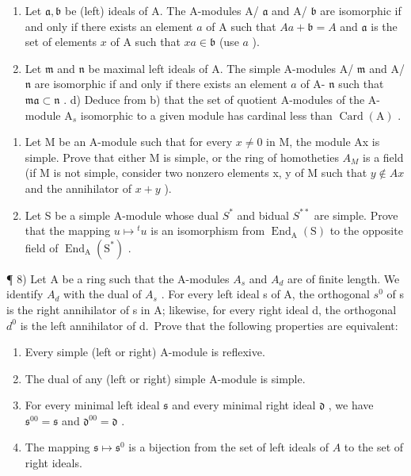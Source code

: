 \begin{enumerate}
\def\labelenumi{\alph{enumi})}
\setcounter{enumi}{1}
\item
  Let \(\mathfrak{a},\mathfrak{b}\) be (left) ideals of A. The A-modules A/ \(\mathfrak{a}\) and A/ \(\mathfrak{b}\) are isomorphic if and only if there exists an element \(a\) of A such that \(Aa + \mathfrak{b} = A\) and \(\mathfrak{a}\) is the set of elements \(x\) of A such that \(xa\in \mathfrak{b}\) (use \(a\) ).
\item
  Let \(\mathfrak{m}\) and \(\mathfrak{n}\) be maximal left ideals of A. The simple A-modules A/ \(\mathfrak{m}\) and A/ \(\mathfrak{n}\) are isomorphic if and only if there exists an element \(a\) of A- \(\mathfrak{n}\) such that \(\mathfrak{ma} \subset \mathfrak{n}\) . d) Deduce from b) that the set of quotient A-modules of the A-module \(\mathrm{A}_s\) isomorphic to a given module has cardinal less than \(\operatorname{Card}(\mathrm{A})\) .
\end{enumerate}

\begin{enumerate}
\def\labelenumi{\arabic{enumi})}
\setcounter{enumi}{5}
\item
  Let M be an A-module such that for every \(x \neq 0\) in M, the module Ax is simple. Prove that either M is simple, or the ring of homotheties \(A_{M}\) is a field (if M is not simple, consider two nonzero elements x, y of M such that \(y \notin Ax\) and the annihilator of \(x + y\) ).
\item
  Let S be a simple A-module whose dual \(S^{*}\) and bidual \(S^{**}\) are simple. Prove that the mapping \(u \mapsto {}^{t}u\) is an isomorphism from \(\operatorname{End}_{\mathrm{A}}(\mathrm{S})\) to the opposite field of \(\operatorname{End}_{\mathrm{A}}(\mathrm{S}^{*})\) .
\end{enumerate}

¶ 8) Let A be a ring such that the A-modules \(A_{s}\) and \(A_{d}\) are of finite length. We identify \(A_{d}\) with the dual of \(A_{s}\) . For every left ideal s of A, the orthogonal \(s^{0}\) of s is the right annihilator of s in A; likewise, for every right ideal d, the orthogonal \(d^{0}\) is the left annihilator of d.~Prove that the following properties are equivalent:

\begin{enumerate}
\def\labelenumi{(\roman{enumi})}
\item
  Every simple (left or right) A-module is reflexive.
\item
  The dual of any (left or right) simple A-module is simple.
\item
  For every minimal left ideal \(\mathfrak{s}\) and every minimal right ideal \(\mathfrak{d}\) , we have \(\mathfrak{s}^{00} = \mathfrak{s}\) and \(\mathfrak{d}^{00} = \mathfrak{d}\) .
\item
  The mapping \(\mathfrak{s} \mapsto \mathfrak{s}^0\) is a bijection from the set of left ideals of \(A\) to the set of right ideals.
\end{enumerate}

